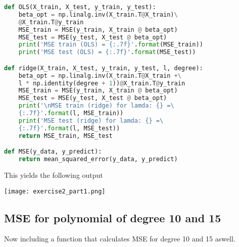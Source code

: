 \documentclass{article}
\begin{document}
\begin{lstlisting}[language=Python]    
def OLS(X_train, X_test, y_train, y_test):
    beta_opt = np.linalg.inv(X_train.T@X_train)\
    @X_train.T@y_train
    MSE_train = MSE(y_train, X_train @ beta_opt)
    MSE_test = MSE(y_test, X_test @ beta_opt)
    print('MSE train (OLS) = {:.7f}'.format(MSE_train))
    print('MSE test (OLS) = {:.7f}'.format(MSE_test))

def ridge(X_train, X_test, y_train, y_test, l, degree):
    beta_opt = np.linalg.inv(X_train.T@X_train +\
    l * np.identity(degree + 1))@X_train.T@y_train
    MSE_train = MSE(y_train, X_train @ beta_opt)
    MSE_test = MSE(y_test, X_test @ beta_opt)
    print('\nMSE train (ridge) for lamda: {} =\
    {:.7f}'.format(l, MSE_train))
    print('MSE test (ridge) for lamda: {} =\
    {:.7f}'.format(l, MSE_test))
    return MSE_train, MSE_test

def MSE(y_data, y_predict):
    return mean_squared_error(y_data, y_predict)
\end{lstlisting}

This yields the following output
\begin{center}
    \texttt{[image: exercise2\_part1.png]} %
\end{center}

\subsection*{MSE for polynomial of degree 10 and 15}
Now including a function that calculates MSE for degree 10 and 15 aswell.
\end{document}
